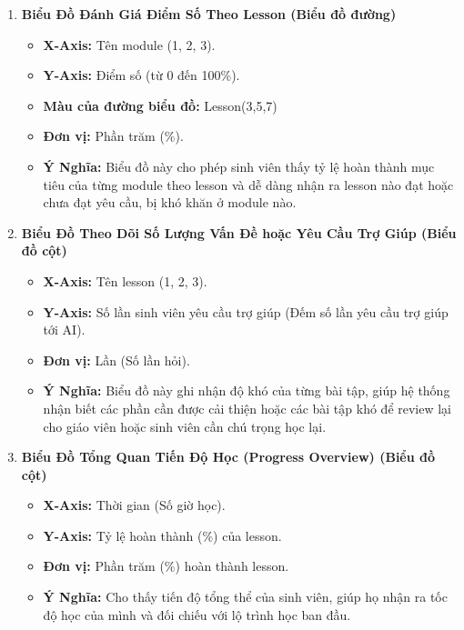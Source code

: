\begin{enumerate}
    \item \textbf{Biểu Đồ Đánh Giá Điểm Số Theo Lesson (Biểu đồ đường)}
    \begin{itemize}
        \item\textbf{X-Axis:} Tên module (1, 2, 3).
\item\textbf{Y-Axis:} Điểm số (từ 0 đến 100\%).
\item\textbf{Màu của đường biểu đồ:} Lesson(3,5,7)
\item\textbf{Đơn vị:} Phần trăm (\%).
\item\textbf{Ý Nghĩa:} Biểu đồ này cho phép sinh viên thấy tỷ lệ hoàn thành mục tiêu của từng module theo lesson và dễ dàng nhận ra lesson nào đạt hoặc chưa đạt yêu cầu, bị khó khăn ở module nào. 

    \end{itemize}
        \item \textbf{Biểu Đồ Theo Dõi Số Lượng Vấn Đề hoặc Yêu Cầu Trợ Giúp (Biểu đồ cột)}
    \begin{itemize}
        \item\textbf{X-Axis:} Tên lesson (1, 2, 3).
\item\textbf{Y-Axis:} Số lần sinh viên yêu cầu trợ giúp (Đếm số lần yêu cầu trợ giúp tới AI).
\item\textbf{Đơn vị:} Lần (Số lần hỏi).
\item\textbf{Ý Nghĩa:} Biểu đồ này ghi nhận độ khó của từng bài tập, giúp hệ thống nhận biết các phần cần được cải thiện hoặc các bài tập khó để review lại cho giáo viên hoặc sinh viên cần chú trọng học lại.
    \end{itemize}
            \item \textbf{Biểu Đồ Tổng Quan Tiến Độ Học (Progress Overview) (Biểu đồ cột)}
    \begin{itemize}
        \item\textbf{X-Axis:} Thời gian (Số giờ học).
\item\textbf{Y-Axis:} Tỷ lệ hoàn thành (\%) của lesson.
\item\textbf{Đơn vị:} Phần trăm (\%) hoàn thành lesson.
\item\textbf{Ý Nghĩa:} Cho thấy tiến độ tổng thể của sinh viên, giúp họ nhận ra tốc độ học của mình và đối chiếu với lộ trình học ban đầu.
    \end{itemize}
\end{enumerate}